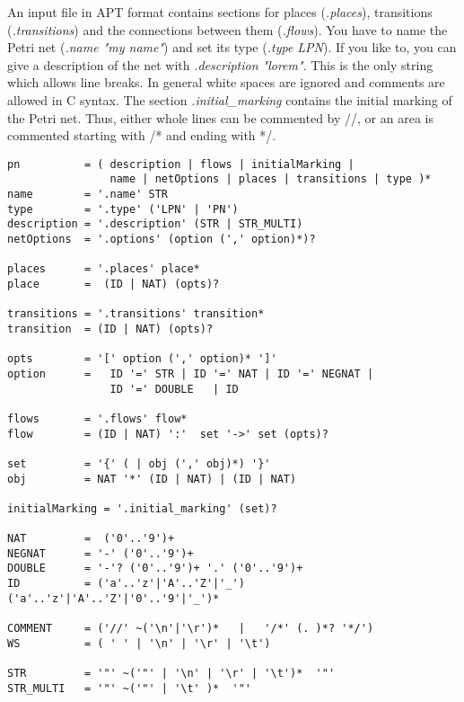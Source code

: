 \documentclass[12pt,twoside,a4paper,openright]{memoir}
\begin{document}
An input file in APT format contains sections for places (\emph{.places}), transitions (\emph{.transitions}) 
and the connections between them (\emph{.flows}). You have to name the Petri net
(\emph{.name "my name"}) and set its type (\emph{.type LPN}). If you like to, you can give a 
description of the net with \emph{.description "lorem"}.
This is the only string which allows line breaks.
In general white spaces are ignored and comments are allowed in C syntax. 
The section \emph{.initial\_marking} contains the initial marking of the Petri net.
Thus, either whole lines can be commented by //, or an area is commented starting with /* and ending with */.
\begin{lstlisting}[captionpos=b, caption=Simplified grammar of the APT format for labeled Petri nets., label = lst:grammar,language=ebnf]
pn     		= ( description | flows | initialMarking |
 				name | netOptions | places | transitions | type )*
name   		= '.name' STR
type   		= '.type' ('LPN' | 'PN')
description = '.description' (STR | STR_MULTI)
netOptions  = '.options' (option (',' option)*)?

places      = '.places' place*
place       =  (ID | NAT) (opts)? 

transitions = '.transitions' transition*
transition  = (ID | NAT) (opts)? 

opts 		= '[' option (',' option)* ']'
option 		= 	ID '=' STR | ID '=' NAT	| ID '=' NEGNAT |
				ID '=' DOUBLE	| ID
	
flows 		= '.flows' flow*
flow  		= (ID | NAT) ':'  set '->' set (opts)?

set			= '{' ( | obj (',' obj)*) '}'
obj			= NAT '*' (ID | NAT) | (ID | NAT)

initialMarking = '.initial_marking' (set)?

NAT			=  ('0'..'9')+
NEGNAT		= '-' ('0'..'9')+
DOUBLE		= '-'? ('0'..'9')+ '.' ('0'..'9')+
ID			= ('a'..'z'|'A'..'Z'|'_') ('a'..'z'|'A'..'Z'|'0'..'9'|'_')*

COMMENT		= ('//' ~('\n'|'\r')*	|   '/*' (. )*? '*/')
WS			= ( ' ' | '\n' | '\r' | '\t')

STR			= '"' ~('"' | '\n' | '\r' | '\t')*  '"'
STR_MULTI	= '"' ~('"' | '\t' )*  '"'
\end{lstlisting}
\end{document}

